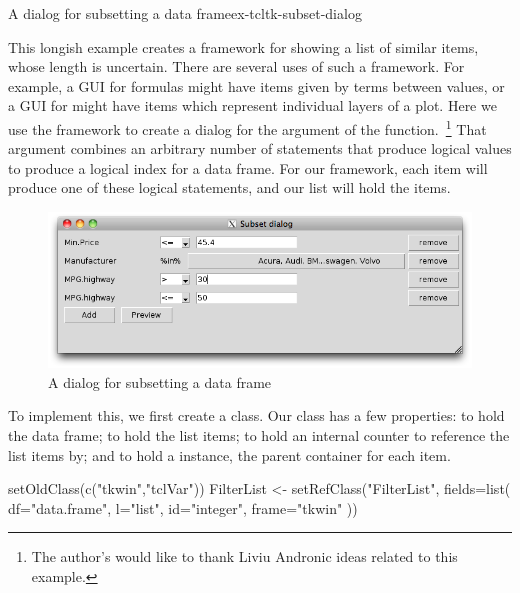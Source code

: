 \begin{example}{A dialog for subsetting a data frame}{ex-tcltk-subset-dialog}
%

This longish example creates a framework for showing a list of similar
items, whose length is uncertain. There are several uses of such a framework. For example, a GUI
for formulas might have items given by terms between \code{+} values,
or a GUI for  might have items which represent individual
layers of a plot. Here we use the framework to create a dialog for the
 argument of the 
function.~\footnote{The author's would like to thank Liviu Andronic
  ideas related to this example.} That argument
combines an arbitrary number of statements that produce logical values
to produce a logical index for a data frame. For our framework, each
item will produce one of these logical statements, and our list will
hold the items.

\begin{figure}
  \centering
  \includegraphics[width=.8\textwidth]{fig-tcltk-subset-filter.png}
  \caption{A dialog for subsetting a data frame}
  \label{fig:tcltk-subset-filter}
\end{figure}
%

To implement this, we first create a  class. Our
class has a few properties:  to hold the data frame; 
to hold the list items;  to hold an internal counter to
reference the list items by; and  to hold a
 instance, the parent container for each item.

\begin{Schunk}
\begin{Sinput}
 setOldClass(c("tkwin","tclVar"))
 FilterList <- setRefClass("FilterList",
                           fields=list(
                             df="data.frame",
                             l="list",
                             id="integer",
                             frame="tkwin" 
                             ))
\end{Sinput}
\end{Schunk}


\end{example}
